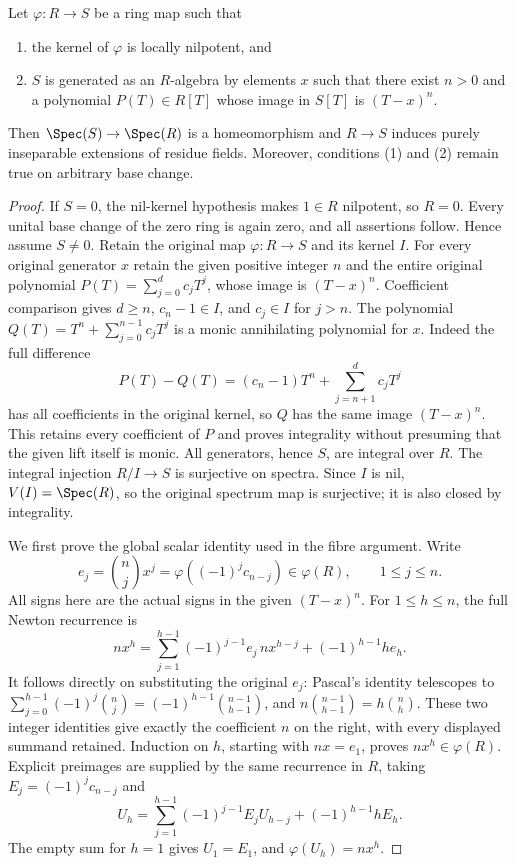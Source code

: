 \begin{lemma}
\label{lemma-universally-bijective}
Let $\varphi : R \to S$ be a ring map such that
\begin{enumerate}
\item the kernel of $\varphi$ is locally nilpotent, and
\item $S$ is generated as an $R$-algebra by elements $x$
such that there exist $n > 0$ and a polynomial $P(T) \in R[T]$
whose image in $S[T]$ is $(T - x)^n$.
\end{enumerate}
Then $\Spec(S) \to \Spec(R)$ is a homeomorphism and $R \to S$
induces purely inseparable extensions of residue fields.
Moreover, conditions (1) and (2) remain true on arbitrary base change.
\end{lemma}

\begin{proof}
If $S=0$, the nil-kernel hypothesis
makes $1\in R$ nilpotent, so $R=0$.
Every unital base change of the zero
ring is again zero, and all assertions
follow. Hence assume $S\neq0$.
Retain the original map $\varphi:R\to S$
and its kernel $I$. For every original
generator $x$ retain the given positive
integer $n$ and the entire original
polynomial $P(T)=\sum_{j=0}^d c_jT^j$,
whose image is $(T-x)^n$. Coefficient
comparison gives $d\geq n$,
$c_n-1\in I$, and $c_j\in I$ for
$j>n$. The polynomial
$Q(T)=T^n+\sum_{j=0}^{n-1}c_jT^j$
is a monic annihilating polynomial
for $x$. Indeed the full difference
$$
P(T)-Q(T)=(c_n-1)T^n+
\sum_{j=n+1}^d c_jT^j
$$
has all coefficients in the original
kernel, so $Q$ has the same image
$(T-x)^n$. This retains every
coefficient of $P$ and proves
integrality without presuming that
the given lift itself is monic.
All generators, hence $S$, are
integral over $R$. The integral
injection $R/I\to S$ is surjective
on spectra. Since $I$ is nil,
$V(I)=\Spec(R)$, so the original
spectrum map is surjective; it is
also closed by integrality.

We first prove the global scalar
identity used in the fibre argument.
Write
$$
e_j=\binom nj x^j
=\varphi((-1)^j c_{n-j})\in\varphi(R),
\qquad 1\leq j\leq n.
$$
All signs here are the actual signs
in the given $(T-x)^n$. For
$1\leq h\leq n$, the full Newton
recurrence is
$$
n x^h=
\sum_{j=1}^{h-1}(-1)^{j-1}e_j\,n x^{h-j}
+(-1)^{h-1}h e_h.
$$
It follows directly on substituting
the original $e_j$: Pascal's identity
telescopes to
$\sum_{j=0}^{h-1}(-1)^j\binom nj
=(-1)^{h-1}\binom{n-1}{h-1}$,
and $n\binom{n-1}{h-1}=h\binom nh$.
These two integer identities give
exactly the coefficient $n$ on the
right, with every displayed summand
retained. Induction on $h$, starting
with $n x=e_1$, proves $n x^h\in\varphi(R)$.
Explicit preimages are supplied by
the same recurrence in $R$, taking
$E_j=(-1)^j c_{n-j}$ and
$$
U_h=\sum_{j=1}^{h-1}(-1)^{j-1}E_j U_{h-j}
+(-1)^{h-1}h E_h.
$$
The empty sum for $h=1$ gives
$U_1=E_1$, and $\varphi(U_h)=n x^h$.


\end{proof}
